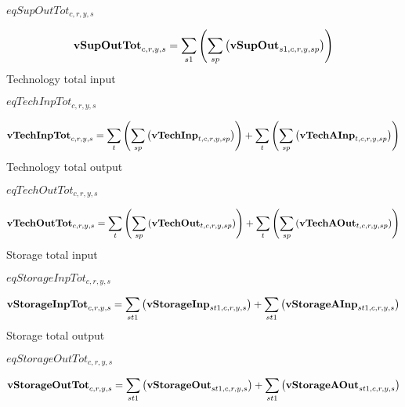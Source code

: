 \documentclass{article}
\begin{document}
$eqSupOutTot_{c,r,y,s}$





\begin{dmath} 
{\bf vSupOutTot}_{c,r,y,s}  =  \sum_{s1}{\left(\sum_{sp}{\left({\bf vSupOut}_{s1,c,r,y,sp}\right)}\right)}
\end{dmath} 
Technology total input







$eqTechInpTot_{c,r,y,s}$





\begin{dmath} 
{\bf vTechInpTot}_{c,r,y,s}  =  \sum_{t}{\left(\sum_{sp}{\left({\bf vTechInp}_{t,c,r,y,sp}\right)}\right)}+\sum_{t}{\left(\sum_{sp}{\left({\bf vTechAInp}_{t,c,r,y,sp}\right)}\right)}
\end{dmath} 
Technology total output







$eqTechOutTot_{c,r,y,s}$





\begin{dmath} 
{\bf vTechOutTot}_{c,r,y,s}  =  \sum_{t}{\left(\sum_{sp}{\left({\bf vTechOut}_{t,c,r,y,sp}\right)}\right)}+\sum_{t}{\left(\sum_{sp}{\left({\bf vTechAOut}_{t,c,r,y,sp}\right)}\right)}
\end{dmath} 
Storage total input







$eqStorageInpTot_{c,r,y,s}$





\begin{dmath} 
{\bf vStorageInpTot}_{c,r,y,s}  =  \sum_{st1}{\left({\bf vStorageInp}_{st1,c,r,y,s}\right)}+\sum_{st1}{\left({\bf vStorageAInp}_{st1,c,r,y,s}\right)}
\end{dmath} 
Storage total output







$eqStorageOutTot_{c,r,y,s}$





\begin{dmath} 
{\bf vStorageOutTot}_{c,r,y,s}  =  \sum_{st1}{\left({\bf vStorageOut}_{st1,c,r,y,s}\right)}+\sum_{st1}{\left({\bf vStorageAOut}_{st1,c,r,y,s}\right)}
\end{dmath} 
\end{document}
